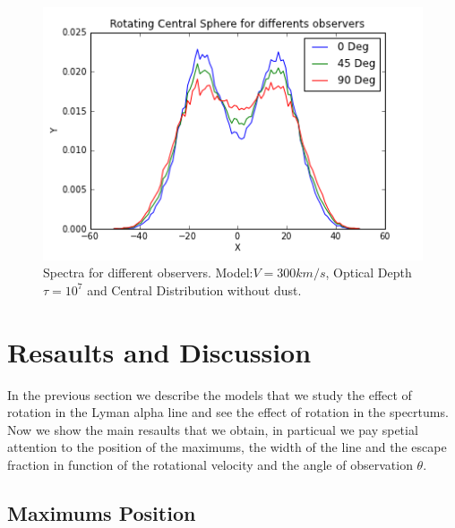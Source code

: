\documentclass{article}
\theoremstyle{definition}
\theoremstyle{remark}
\begin{document}
\begin{figure}[H]
\begin{center}
\includegraphics[scale=0.45]{Observers.png}
\end{center}
\caption{Spectra for different observers. Model:$V=300km/s$, Optical
  Depth $\tau=10^{7}$ and Central Distribution without dust.} 
\end{figure}




\section*{Resaults and Discussion}
\label{sec:Results_ly_Rotation}


In the previous section we describe the models that we study the
effect of rotation in the Lyman alpha line and see the effect of
rotation in the specrtums. Now we show the main resaults that we
obtain, in particual we pay spetial attention to the position of the
maximums, the width of the line and the escape fraction in function of
the rotational velocity and the angle of observation $\theta$.  

\subsection*{Maximums Position}
\end{document}

